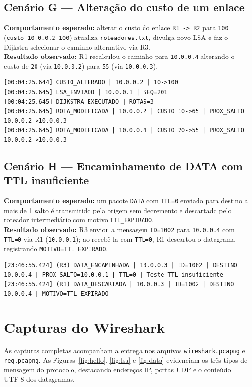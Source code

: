 ﻿\documentclass[11pt,a4paper]{article}
\begin{document}
\subsection{Cenário G --- Alteração do custo de um enlace}
\textbf{Comportamento esperado:} alterar o custo do enlace \texttt{R1 -> R2} para \texttt{100} (\texttt{custo 10.0.0.2 100}) atualiza \texttt{roteadores.txt}, divulga novo LSA e faz o Dijkstra selecionar o caminho alternativo via R3.\\
\textbf{Resultado observado:} R1 recalculou o caminho para \texttt{10.0.0.4} alterando o custo de \texttt{20} (via \texttt{10.0.0.2}) para \texttt{55} (via \texttt{10.0.0.3}).
\begin{lstlisting}
[00:04:25.644] CUSTO_ALTERADO | 10.0.0.2 | 10->100
[00:04:25.645] LSA_ENVIADO | 10.0.0.1 | SEQ=201
[00:04:25.645] DIJKSTRA_EXECUTADO | ROTAS=3
[00:04:25.645] ROTA_MODIFICADA | 10.0.0.2 | CUSTO 10->65 | PROX_SALTO 10.0.0.2->10.0.0.3
[00:04:25.645] ROTA_MODIFICADA | 10.0.0.4 | CUSTO 20->55 | PROX_SALTO 10.0.0.2->10.0.0.3
\end{lstlisting}

\subsection{Cenário H --- Encaminhamento de DATA com TTL insuficiente}
\textbf{Comportamento esperado:} um pacote \texttt{DATA} com \texttt{TTL=0} enviado para destino a mais de 1 salto é transmitido pela origem sem decremento e descartado pelo roteador intermediário com motivo \texttt{TTL\_EXPIRADO}.\\
\textbf{Resultado observado:} R3 enviou a mensagem \texttt{ID=1002} para \texttt{10.0.0.4} com \texttt{TTL=0} via R1 (\texttt{10.0.0.1}); ao recebê-la com \texttt{TTL=0}, R1 descartou o datagrama registrando \texttt{MOTIVO=TTL\_EXPIRADO}.
\begin{lstlisting}
[23:46:55.424] (R3) DATA_ENCAMINHADA | 10.0.0.3 | ID=1002 | DESTINO 10.0.0.4 | PROX_SALTO=10.0.0.1 | TTL=0 | Teste TTL insuficiente
[23:46:55.424] (R1) DATA_DESCARTADA | 10.0.0.3 | ID=1002 | DESTINO 10.0.0.4 | MOTIVO=TTL_EXPIRADO
\end{lstlisting}

\section{Capturas do Wireshark}

As capturas completas acompanham a entrega nos arquivos \texttt{wireshark.pcapng} e \texttt{req.pcapng}. As Figuras~\ref{fig:hello}, \ref{fig:lsa} e \ref{fig:data} evidenciam os três tipos de mensagem do protocolo, destacando endereços IP, portas UDP e o conteúdo UTF-8 dos datagramas.
\end{document}
